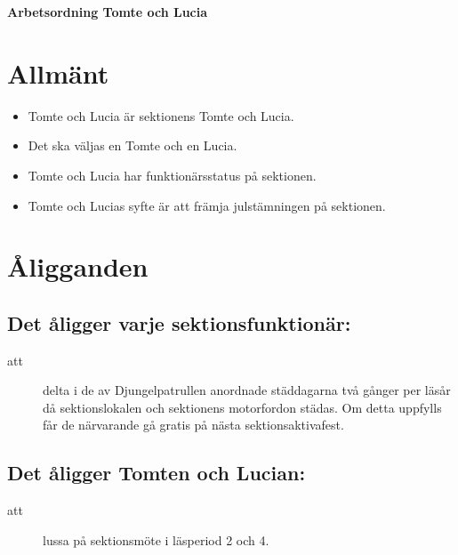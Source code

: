 \renewcommand{\dateseparator}{-} %

\renewcommand{\forening}{Tomte och Lucia}

\begin{center}
\LARGE{\textbf{Arbetsordning Tomte och Lucia}}
\end{center}


\section{Allmänt}
\begin{itemize}
\item Tomte och Lucia är sektionens Tomte och Lucia.

\item Det ska väljas en Tomte och en Lucia.

\item Tomte och Lucia har funktionärsstatus på sektionen.
\item Tomte och Lucias syfte är att främja julstämningen på sektionen.

\end{itemize}


\section{Åligganden}
\subsection{Det åligger varje sektionsfunktionär:}
    \begin{description}
      \item[att] delta i de av Djungelpatrullen anordnade städdagarna två gånger per
      läsår då sektionslokalen och sektionens motorfordon städas. Om detta uppfylls får de närvarande gå gratis på nästa
      sektionsaktivafest.
    \end{description}
    
\subsection{Det åligger Tomten och Lucian:}
\begin{description}
      \item[att] lussa på sektionsmöte i läsperiod 2 och 4. 
      
\end{description}

